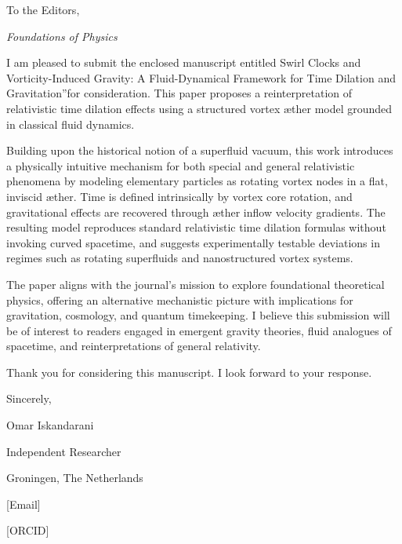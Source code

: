 
To the Editors,

\textit{Foundations of Physics}


I am pleased to submit the enclosed manuscript entitled \grqq Swirl Clocks and Vorticity-Induced Gravity: A Fluid-Dynamical Framework for Time Dilation and Gravitation\textquotedblright for consideration. This paper proposes a reinterpretation of relativistic time dilation effects using a structured vortex æther model grounded in classical fluid dynamics.


Building upon the historical notion of a superfluid vacuum, this work introduces a physically intuitive mechanism for both special and general relativistic phenomena by modeling elementary particles as rotating vortex nodes in a flat, inviscid æther. Time is defined intrinsically by vortex core rotation, and gravitational effects are recovered through æther inflow velocity gradients. The resulting model reproduces standard relativistic time dilation formulas without invoking curved spacetime, and suggests experimentally testable deviations in regimes such as rotating superfluids and nanostructured vortex systems.


The paper aligns with the journal's mission to explore foundational theoretical physics, offering an alternative mechanistic picture with implications for gravitation, cosmology, and quantum timekeeping. I believe this submission will be of interest to readers engaged in emergent gravity theories, fluid analogues of spacetime, and reinterpretations of general relativity.


Thank you for considering this manuscript. I look forward to your response.


Sincerely,

Omar Iskandarani

Independent Researcher

Groningen, The Netherlands

[Email]

[ORCID]